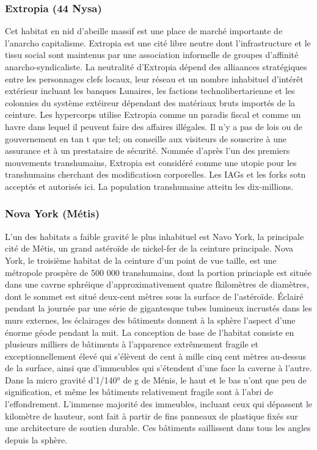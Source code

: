 \subsubsection{Extropia (44 Nysa)} \label{sec:extropia-44-nysa} 

Cet habitat en nid d'abeille massif est une place de marché importante de l'anarcho capitalisme. Extropia est une cité libre neutre dont l'infrastructure et le tissu social sont maintenus par une association informelle de groupes d'affinité anarcho-syndicaliste. La neutralité d'Extropia dépend des alliaances stratégiques entre les personnages clefs locaux, leur réseau et un nombre inhabituel d'intérêt extérieur incluant les banques Lunaires, les factions technolibertarienne et les colonnies du système extéireur dépendant des matériaux bruts importés de la ceinture. Les hypercorps utilise Extropia comme un paradis fiscal et comme un havre dans lequel il peuvent faire des affaires illégales. Il n'y a pas de lois ou de gouvernement en tan t que tel; on conseille aux visiteurs de souscrire à une assurance et à un prestataire de sécurité. Nommée d'après l'un des premiers mouvements transhumains, Extropia est considéré comme une utopie pour les transhumains cherchant des modificatiosn corporelles. Les IAGs et les forks sotn acceptés et autorisés ici. La population transhumaine atteitn les dix-millions. 

\subsubsection{Nova York (Métis)} \label{sec:nova-york-metis} 

L'un des habitats a faible gravité le plus inhabituel est Navo York, la principale cité de Métis, un grand astéroïde de nickel-fer de la ceinture principale. Nova York, le troisième habitat de la ceinture d'un point de vue taille, est une métropole prospère de 500 000 transhumains, dont la portion princiaple est située dans une cavrne sphréique d'approximativement quatre fkilomètres de diamètres, dont le  sommet est situé deux-cent mètres sous la surface de l'astéroïde. Éclairé pendant la journée par une série de gigantesque tubes lumineux incrustés dans les murs externes, les éclairages des bâtiments donnent à la sphère l'aspect d'une énorme géode pendant la nuit. La conception de base de l'habitat consiste en plusieurs milliers de bâtiments à l'apparence extrêmement fragile et exceptionnellement élevé qui s'élèvent de cent à mille cinq cent mètres au-dessus de la surface, ainsi que d'immeubles qui s'étendent d'une face la caverne à l'autre. Dans la micro gravité d'1/140° de g de Ménis, le haut et le bas n'ont que peu de signification, et même les bâtiments relativement fragile sont à l'abri de l'effondrement. L'immense majorité des immeubles, incluant ceux qui dépassent le kilomètre de hauteur, sont fait à partir de fins panneaux de plastique fixés sur une architecture de soutien durable. Ces bâtiments saillissent dans tous les angles depuis la sphère. 


